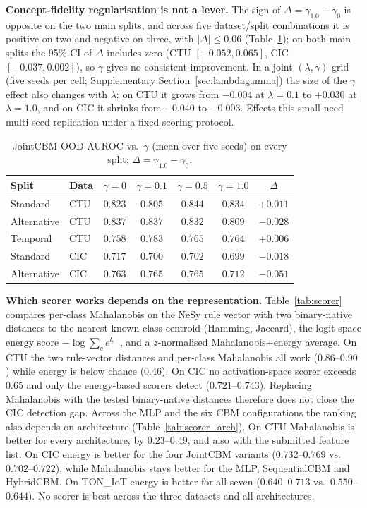 \documentclass[journal]{IEEEtran}
\begin{document}
\textbf{Concept-fidelity regularisation is not a lever.} The sign of $\Delta{=}\gamma_{1.0}{-}\gamma_0$ is opposite on the two main splits, and across five dataset/split combinations it is positive on two and negative on three, with $|\Delta|\le0.06$ (Table~\ref{tab:gamma_splits}); on both main splits the 95\% CI of $\Delta$ includes zero (CTU $[-0.052, 0.065]$, CIC $[-0.037, 0.002]$), so $\gamma$ gives no consistent improvement. In a joint $(\lambda,\gamma)$ grid (five seeds per cell; Supplementary Section~\ref{sec:lambdagamma}) the size of the $\gamma$ effect also changes with $\lambda$: on CTU it grows from $-0.004$ at $\lambda{=}0.1$ to $+0.030$ at $\lambda{=}1.0$, and on CIC it shrinks from $-0.040$ to $-0.003$. Effects this small need multi-seed replication under a fixed scoring protocol.

\begin{table}[t]
\centering\footnotesize
\caption{JointCBM OOD AUROC vs.\ $\gamma$ (mean over five seeds) on every split; $\Delta{=}\gamma_{1.0}{-}\gamma_0$.}
\label{tab:gamma_splits}
\setlength{\tabcolsep}{4pt}
\begin{tabular}{llccccc}
\toprule
Split & Data & $\gamma{=}0$ & $\gamma{=}0.1$ & $\gamma{=}0.5$ & $\gamma{=}1.0$ & $\Delta$ \\
\midrule
Standard    & CTU & $0.823$ & $0.805$ & $0.844$ & $0.834$ & $+0.011$ \\
Alternative & CTU & $0.837$ & $0.837$ & $0.832$ & $0.809$ & $-0.028$ \\
Temporal    & CTU & $0.758$ & $0.783$ & $0.765$ & $0.764$ & $+0.006$ \\
Standard    & CIC & $0.717$ & $0.700$ & $0.702$ & $0.699$ & $-0.018$ \\
Alternative & CIC & $0.763$ & $0.765$ & $0.765$ & $0.712$ & $-0.051$ \\
\bottomrule
\end{tabular}
\end{table}

\textbf{Which scorer works depends on the representation.} Table~\ref{tab:scorer} compares per-class Mahalanobis on the NeSy rule vector with two binary-native distances to the nearest known-class centroid (Hamming, Jaccard), the logit-space energy score $-\log\sum_c e^{l_c}$~\cite{liu2020energy}, and a $z$-normalised Mahalanobis$+$energy average. On CTU the two rule-vector distances and per-class Mahalanobis all work ($0.86$--$0.90$) while energy is below chance ($0.46$). On CIC no activation-space scorer exceeds $0.65$ and only the energy-based scorers detect ($0.721$--$0.743$). Replacing Mahalanobis with the tested binary-native distances therefore does not close the CIC detection gap. Across the MLP and the six CBM configurations the ranking also depends on architecture (Table~\ref{tab:scorer_arch}). On CTU Mahalanobis is better for every architecture, by $0.23$--$0.49$, and also with the submitted feature list. On CIC energy is better for the four JointCBM variants ($0.732$--$0.769$ vs.\ $0.702$--$0.722$), while Mahalanobis stays better for the MLP, SequentialCBM and HybridCBM. On TON\_IoT energy is better for all seven ($0.640$--$0.713$ vs.\ $0.550$--$0.644$). No scorer is best across the three datasets and all architectures.
\end{document}

